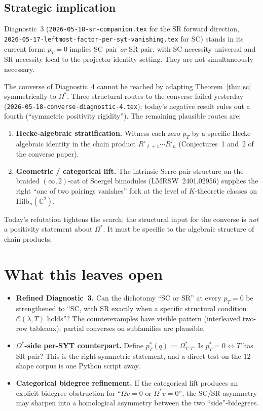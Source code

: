 \documentclass[11pt]{article}
\theoremstyle{definition}
\newcommand{\Om}{\Omega}
\newcommand{\Omstar}{\Omega^{\!*}}
\newcommand{\la}{\lambda}
\begin{document}
\subsection{Strategic implication}

Diagnostic~3 (\texttt{2026-05-18-sr-companion.tex} for the SR forward
direction, \texttt{2026-05-17-leftmost-factor-per-syt-vanishing.tex}
for SC) stands in its current form: $p_T = 0$ implies SC pair \emph{or}
SR pair, with SC necessity universal and SR necessity local to the
projector-identity setting. They are not simultaneously necessary.

The converse of Diagnostic~4 cannot be reached by adapting
Theorem~\ref{thm:sc} symmetrically to $\Omstar$. Three structural routes
to the converse failed yesterday
(\texttt{2026-05-18-converse-diagnostic-4.tex}); today's negative result
rules out a fourth (``symmetric positivity rigidity''). The remaining
plausible routes are:
\begin{enumerate}[leftmargin=2em]
\item \textbf{Hecke-algebraic stratification.} Witness each zero $p_T$
  by a specific Hecke-algebraic identity in the chain product
  $R'_{\ell+1} \cdots R'_n$ (Conjectures~1 and~2 of the converse paper).
\item \textbf{Geometric / categorical lift.} The intrinsic Serre-pair
  structure on the braided $(\infty,2)$-cat of Soergel bimodules
  (LMRSW~2401.02956) supplies the right ``one of two pairings vanishes''
  fork at the level of $K$-theoretic classes on $\mathrm{Hilb}_n(\mathbb{C}^2)$.
\end{enumerate}
Today's refutation tightens the search: the structural input for the
converse is \emph{not} a positivity statement about $\Omstar$. It must
be specific to the algebraic structure of chain products.

\section{What this leaves open}

\begin{itemize}[leftmargin=2em]
\item \textbf{Refined Diagnostic~3.} Can the dichotomy ``SC or SR''
  at every $p_T = 0$ be strengthened to ``SC, with SR exactly when a
  specific structural condition $\mathcal{C}(\la, T)$ holds''? The
  counterexamples have visible pattern (interleaved two-row tableaux);
  partial converses on subfamilies are plausible.
\item \textbf{$\Omstar$-side per-SYT counterpart.} Define
  $p^*_T(q) := \Omstar_{T,T}$. Is $p^*_T = 0 \iff T$ has SR pair?
  This is the right symmetric statement, and a direct test on the
  $12$-shape corpus is one Python script away.
\item \textbf{Categorical bidegree refinement.} If the categorical
  lift produces an explicit bidegree obstruction for ``$\Om v = 0$ or
  $\Omstar v = 0$'', the SC/SR asymmetry may sharpen into a homological
  asymmetry between the two ``side''-bidegrees.
\end{itemize}
\end{document}
